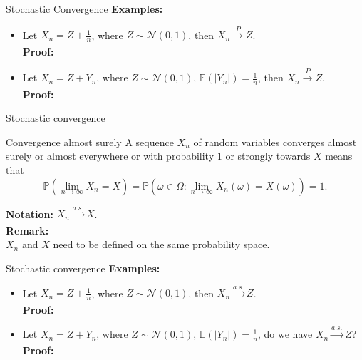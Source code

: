 \documentclass [aspectratio=169]{beamer}
\begin{document}
\begin{frame}{Stochastic Convergence}
    \textbf{Examples:}\\
    \begin{itemize}
        \item Let $X_n = Z + \frac{1}{n}$, where $Z \sim \mathcal{N}(0,1)$, then $X_n \xrightarrow[]{P} Z$.\\
    \vspace{0.1in}
    \textbf{Proof:}\\
    \vspace{0.7in}
    \item Let $X_n = Z + Y_n$, where $Z \sim \mathcal{N}(0,1)$, $\mathbb{E}(|Y_n|) = \frac{1}{n}$, then $X_n \xrightarrow[]{P} Z$.\\
    \vspace{0.1in}
    \textbf{Proof:}\\
    \vspace{1in}
    \end{itemize}
\end{frame}


\begin{frame}{Stochastic convergence}
    \begin{block}{Convergence almost surely}
    A sequence $X_n$ of random variables converges almost surely or almost everywhere or with probability $1$ or strongly towards $X$ means that
$$
\mathbb{P}\left(\lim _{n\to \infty }\!X_{n}=X\right)= \mathbb{P}\left(\omega \in \Omega: \lim _{n\to \infty }\!X_{n}(\omega)=X(\omega)\right) =1.
$$
\end{block}
\vspace{0.1in}
    \textbf{Notation:}
    $X_n \xrightarrow[]{a.s.} X$.\\
\vspace{0.1in}
\textbf{Remark:}\\
$X_n$ and $X$ need to be defined on the same probability space. 
\end{frame}

\begin{frame}{Stochastic convergence}
     \textbf{Examples:}\\
    \begin{itemize}
        \item Let $X_n = Z + \frac{1}{n}$, where $Z \sim \mathcal{N}(0,1)$, then $X_n \xrightarrow[]{a.s.} Z$.\\
    \vspace{0.1in}
    \textbf{Proof:}\\
    \vspace{0.7in}
    \item Let $X_n = Z + Y_n$, where $Z \sim \mathcal{N}(0,1)$, $\mathbb{E}(|Y_n|) = \frac{1}{n}$, do we have $X_n \xrightarrow[]{a.s.} Z$?\\
    \vspace{0.1in}
    \textbf{Proof:}\\
    \vspace{1in}
    \end{itemize}
\end{frame}
\end{document}
